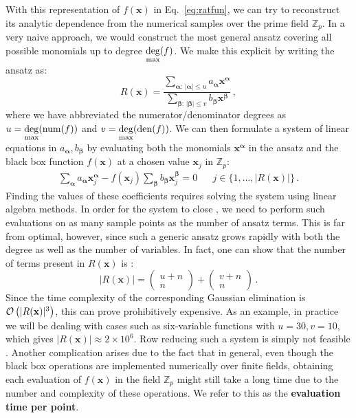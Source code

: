 \documentclass[main.tex]{subfiles}
\begin{document}
With this representation of $f(\mathbf{x})$ in Eq.~\ref{eq:ratfun}, we can try to reconstruct its analytic dependence from the numerical samples over the prime field $\mathbb{Z}_p$. In a very naive approach, we would construct the most general ansatz covering all possible monomials up to degree $\underset{\text{max}}{\deg} (f)$. We make this explicit by writing the ansatz as:
\begin{equation}
    R(\mathbf{x}) = \frac{
    \sum\limits_{\bm{\alpha}:\, |\bm{\alpha}| \le u} a_{\bm{\alpha}} \mathbf{x}^{\bm{\alpha}}
    }{
    \sum\limits_{\bm{\beta}:\, |\bm{\beta}| \le v} b_{\bm{\beta}} \mathbf{x}^{\bm{\beta}}
    }\,,
\end{equation}
where we have abbreviated the numerator/denominator degrees as $u=\underset{\text{max}}{\deg}(\text{num}(f))$ and $v=\underset{\text{max}}{\deg}(\text{den}(f))$. We can then formulate a system of linear equations in $a_{\bm{\alpha}}, b_{\bm{\beta}}$ by evaluating both the monomials $\mathbf{x}^{\bm{\alpha}}$ in the ansatz and the black box function $f(\mathbf{x})$ at a chosen value $\mathbf{x}_j$ in $\mathbb{Z}_p$:
\begin{align}
    \sum_{\bm{\alpha}} a_{\bm{\alpha}} \mathbf{x}_j^{\bm{\alpha}} - 
    f(\mathbf{x}_j) \sum_{\bm{\beta}} b_{\bm{\beta}} \mathbf{x}_j^{\bm{\beta}} = 0 
&&    
j \in \{1, \ldots, |R(\mathbf{x})|\} \,.
\end{align}
Finding the values of these coefficients requires solving the system using linear algebra methods. In order for the system to close , we need to perform such evaluations on as many sample points as the number of ansatz terms. This is far from optimal, however, since such a generic ansatz grows rapidly with both the degree as well as the number of variables. In fact, one can show that the number of terms present in $R(\mathbf{x})$ is :
\begin{equation} \label{eq:naiveansatzlength}
    |R(\mathbf{x})| = 
    \begin{pmatrix}
        u + n \\
        n
    \end{pmatrix}
    +
    \begin{pmatrix}
        v + n \\
        n
    \end{pmatrix}\,.
\end{equation}
Since the time complexity of the corresponding Gaussian elimination is $\mathcal{O}\left(|R(\mathbf{x})|^3\right)$, this can prove prohibitively expensive. As an example, in practice we will be dealing with cases such as six-variable functions with $u=30, v=10$, which gives $|R(\mathbf{x})| \approx 2\times 10^6$. Row reducing such a system is simply not feasible . Another complication arises due to the fact that in general, even though the black box operations are implemented numerically over finite fields, obtaining each evaluation of $f(\mathbf{x})$ in the field $\mathbb{Z}_p$ might still take a long time due to the number and complexity of these operations. We refer to this as the \textbf{evaluation time per point}.
\end{document}
